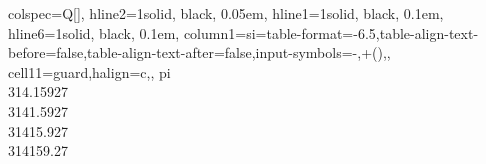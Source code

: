 \begin{table}
\centering
\begin{tblr}[         %
]                     %
{                     %
colspec={Q[]},
hline{2}={1}{solid, black, 0.05em},
hline{1}={1}{solid, black, 0.1em},
hline{6}={1}{solid, black, 0.1em},
column{1}={si={table-format=-6.5,table-align-text-before=false,table-align-text-after=false,input-symbols={-,\*+()}},},
cell{1}{1}={guard,halign=c,},
}                     %
pi \\
314.15927 \\
3141.5927 \\
31415.927 \\
314159.27 \\
\end{tblr}
\end{table} 
